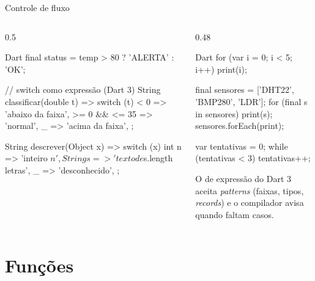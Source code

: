 \documentclass[aspectratio=169,10pt]{beamer}
\begin{document}
\begin{frame}[fragile]{Controle de fluxo}
  \begin{columns}[T]
    \begin{column}{0.5\textwidth}
\begin{codigo}[title=Condições]{Dart}
final status = temp > 80 ? 'ALERTA' : 'OK';

// switch como expressão (Dart 3)
String classificar(double t) => switch (t) {
  < 0 => 'abaixo da faixa',
  >= 0 && <= 35 => 'normal',
  _ => 'acima da faixa',
};

String descrever(Object x) => switch (x) {
  int n => 'inteiro $n',
  String s => 'texto de ${s.length} letras',
  _ => 'desconhecido',
};
\end{codigo}
    \end{column}
    \begin{column}{0.48\textwidth}
\begin{codigo}[title=Laços]{Dart}
for (var i = 0; i < 5; i++) print(i);

final sensores = ['DHT22', 'BMP280', 'LDR'];
for (final s in sensores) print(s);
sensores.forEach(print);

var tentativas = 0;
while (tentativas < 3) {
  tentativas++;
}
\end{codigo}
      \begin{dica}
        O  de expressão do Dart 3 aceita \emph{patterns} (faixas, tipos, \emph{records}) e o compilador avisa quando faltam casos.
      \end{dica}
    \end{column}
  \end{columns}
\end{frame}

\section{Funções}
\end{document}
